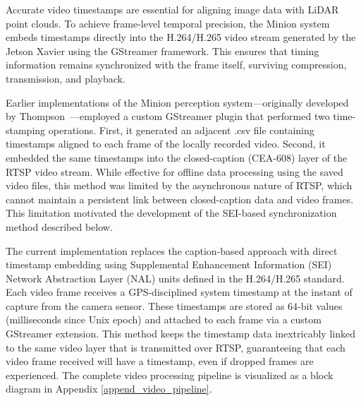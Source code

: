 \documentclass{erauthesis}
\begin{document}
Accurate video timestamps are essential for aligning image data with LiDAR point clouds. To achieve frame-level temporal precision, the Minion system embeds timestamps directly into the H.264/H.265 video stream generated by the Jetson Xavier using the GStreamer framework. This ensures that timing information remains synchronized with the frame itself, surviving compression, transmission, and playback.

Earlier implementations of the Minion perception system—originally developed by Thompson~\cite{thompson2023}—employed a custom GStreamer plugin that performed two time-stamping operations. 
First, it generated an adjacent .csv file containing timestamps aligned to each frame of the locally recorded video. 
Second, it embedded the same timestamps into the closed-caption (CEA-608) layer of the \ac{RTSP} video stream. 
While effective for offline data processing using the saved video files, this method was limited by the asynchronous nature of \ac{RTSP}, which cannot maintain a persistent link between closed-caption data and video frames. 
This limitation motivated the development of the \ac{SEI}-based synchronization method described below.


The current implementation replaces the caption-based approach with direct timestamp embedding using Supplemental Enhancement Information (SEI) Network Abstraction Layer (NAL) units defined in the H.264/H.265 standard.
Each video frame receives a GPS-disciplined system timestamp at the instant of capture from the camera sensor. These timestamps are stored as 64-bit values (milliseconds since Unix epoch) and attached to each frame via a custom GStreamer extension. %
This method keeps the timestamp data inextricably linked to the same video layer that is transmitted over \ac{RTSP}, guaranteeing that each video frame received will have a timestamp, even if dropped frames are experienced.
The complete video processing pipeline is visualized as a block diagram in Appendix \ref{append_video_pipeline}.
\end{document}
